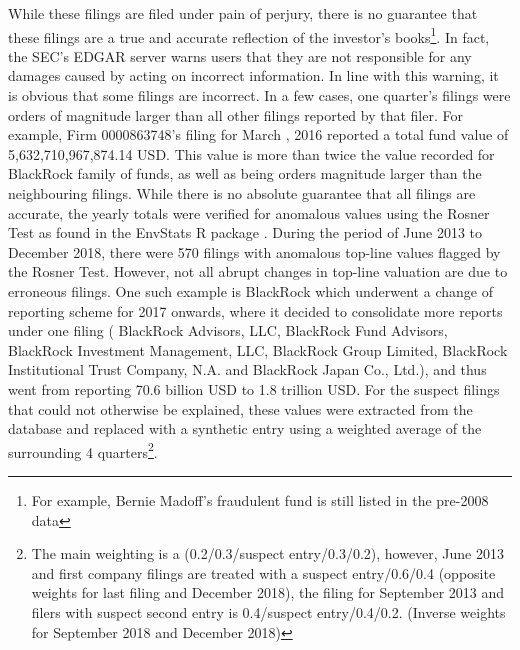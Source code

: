 While these filings are filed under pain of perjury, there is no guarantee that these filings are a true and accurate reflection of the investor's books\footnote{For example, Bernie Madoff's fraudulent fund is still listed in the pre-2008 data}.  In fact, the SEC's EDGAR server warns users that they are not responsible for any damages caused by acting on incorrect information.  In line with this warning, it is obvious that some filings are incorrect.  In a few cases, one quarter's filings were orders of magnitude larger than all other filings reported by that filer.  For example, Firm 0000863748's filing for March , 2016 reported a total fund value of 5,632,710,967,874.14 USD.  This value is more than twice the value recorded for BlackRock family of funds, as well as being orders magnitude larger than the neighbouring filings.  While there is no absolute guarantee that all filings are accurate, the yearly totals were verified for anomalous values using the Rosner Test as found in the EnvStats R package \citep{EnvStats-book}. During the period of June 2013 to December 2018, there were 570 filings with anomalous top-line values flagged by the Rosner Test. However, not all abrupt changes in top-line valuation are due to erroneous filings.  One such example is BlackRock which underwent a change of reporting scheme for 2017 onwards, where it decided to consolidate more reports under one filing ( BlackRock Advisors, LLC, BlackRock Fund Advisors, BlackRock Investment Management, LLC, BlackRock Group Limited, BlackRock Institutional Trust Company, N.A. and BlackRock Japan Co., Ltd.), and thus went from reporting 70.6 billion USD to 1.8 trillion USD. For the suspect filings that could not otherwise be explained, these values were extracted from the database and replaced with a synthetic entry using a weighted average of the surrounding 4 quarters\footnote{The main weighting is a (0.2/0.3/suspect entry/0.3/0.2), however, June 2013 and first company filings are treated with a suspect entry/0.6/0.4 (opposite weights for last filing and December 2018), the filing for September 2013 and filers with suspect second entry is 0.4/suspect entry/0.4/0.2. (Inverse weights for September 2018 and December 2018)}. 

